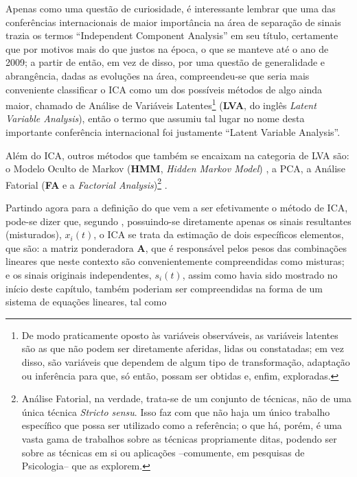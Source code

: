 Apenas como uma questão de curiosidade, é interessante lembrar que uma das conferências internacionais de maior importância na área de separação de sinais trazia os termos ``Independent Component Analysis'' em seu título, certamente que por motivos mais do que justos na época, o que se manteve até o ano de 2009; a partir de então, em vez de disso, por uma questão de generalidade e abrangência, dadas as evoluções na área, compreendeu-se que seria mais conveniente classificar o ICA como um dos possíveis métodos de algo ainda maior, chamado de Análise de Variáveis Latentes\footnote{De modo praticamente oposto às variáveis observáveis, as variáveis latentes são as que não podem ser diretamente aferidas, lidas ou constatadas; em vez disso, são variáveis que dependem de algum tipo de transformação, adaptação ou inferência para que, só então, possam ser obtidas e, enfim, exploradas.} (\textbf{LVA}, do inglês \textit{Latent Variable Analysis}), então o termo que assumiu tal lugar no nome desta importante conferência internacional foi justamente ``Latent Variable Analysis''.


Além do ICA, outros métodos que também se encaixam na categoria de LVA são: o Modelo Oculto de Markov (\textbf{HMM}, \textit{Hidden Markov Model}) \citep{18626}, a PCA, a Análise Fatorial (\textbf{FA} e a \textit{Factorial Analysis})\footnote{Análise Fatorial, na verdade, trata-se de um conjunto de técnicas, não de uma única técnica \textit{Stricto sensu}. Isso faz com que não haja um único trabalho específico que possa ser utilizado como a referência; o que há, porém, é uma vasta gama de trabalhos sobre as técnicas propriamente ditas, podendo ser sobre as técnicas em si ou aplicações --comumente, em pesquisas de Psicologia-- que as explorem.} \citep{vincent1953orgin, c63851e778034799a99dcc4d187768d0, doi:10.1177/001316446002000116}.


Partindo agora para a definição do que vem a ser efetivamente o método de ICA, pode-se dizer que, segundo \citep{hyvarinen2004independent}, possuindo-se diretamente apenas os sinais resultantes (misturados), $x_{i}(t)$, o ICA se trata da estimação de dois específicos elementos, que são: a matriz ponderadora $\mathbf{A}$, que é responsável pelos pesos das combinações lineares que neste contexto são convenientemente compreendidas como misturas; e os sinais originais independentes, $s_{i}(t)$, assim como havia sido mostrado no início deste capítulo, também poderiam ser compreendidas na forma de um sistema de equações lineares, tal como

